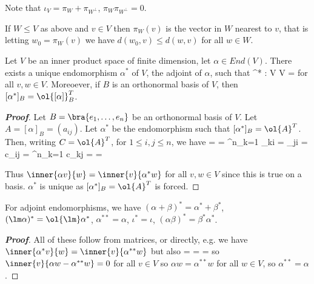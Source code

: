 \begin{remark}
Note that $\iota_V = \pi_W + \pi_{W^\perp}$, $\pi_W\pi_{W^\perp} = 0$.
\end{remark}

\begin{lemma}
If $W \leq V$ as above and $v \in V$ then $\pi_W(v)$ is the vector in $W$ nearest to $v$, that is letting $w_0 = \pi_W(v)$ we have $d(w_0, v) \leq d(w, v)$ for all $w \in W$.
\end{lemma}

\begin{proposition}
Let $V$ be an inner product space of finite dimension, let $\alpha \in End(V )$. There exists a unique endomorphism $\alpha^*$ of $V$, the adjoint of $\alpha$, such that 
\be
\alpha^* : V \to V \qquad\qquad {} = 
\ee
for all $v,w \in V$. Moreoever, if $B$ is an orthonormal basis of $V$, then $[\alpha^*]_B = \ol{[\alpha]}^T_B$.
\end{proposition}

\begin{proof}[\bf Proof]
Let $B = \bra{e_1, \dots, e_n}$ be an orthonormal basis of $V$. Let $A = [\alpha]_B = (a_{ij})$. Let $\alpha^*$ be the endomorphism such that $[\alpha^*]_B = \ol{A}^T$. Then, writing $C = \ol{A}^T$, for $1 \leq  i, j \leq  n$, we have
\be
{} =  = \sum^n_{k=1} _{ki}  = _{ji} = c_{ij} = \sum^n_{k=1} c_{kj} =  = 
\ee

Thus $\inner{\alpha v}{w} = \inner{v}{\alpha^* w}$ for all $v,w \in V$ since this is true on a basis. $\alpha^*$ is unique as $[\alpha^*]_B = \ol{A}^T$ is forced.
\end{proof}

\begin{lemma}
For adjoint endomorphisms, we have $(\alpha + \beta)^* = \alpha^* + \beta^*$, $(\lm\alpha)^* = \ol{\lm}\alpha^*$, $\alpha^{**} = \alpha$, $\iota^* = \iota$, $(\alpha\beta)^* = \beta^*\alpha^*$.
\end{lemma}

\begin{proof}[\bf Proof]
All of these follow from matrices, or directly, e.g. we have $\inner{\alpha^*v}{w} = \inner{v}{\alpha^{**}w}$ but also
\be
{} =  =  = 
\ee
so $\inner{v}{\alpha w - \alpha^{**}w} = 0$ for all $v \in V$ so $\alpha w = \alpha^{**} w$ for all $w \in V$, so $\alpha^{**} = \alpha$.
\end{proof}

